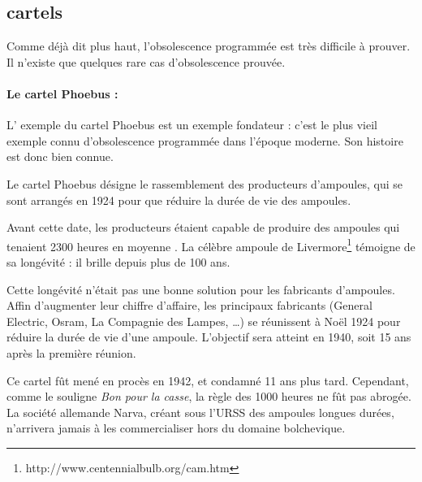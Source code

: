 \subsection{cartels}



Comme déjà dit plus haut, l'obsolescence programmée est très difficile à prouver. Il n'existe que quelques rare cas d'obsolescence prouvée. 

\paragraph*{Le cartel Phoebus : } L' exemple du cartel Phoebus est un exemple fondateur : c'est le plus vieil exemple connu d'obsolescence programmée dans l'époque moderne. Son histoire est donc bien connue. 

Le cartel Phoebus désigne le rassemblement des producteurs d'ampoules, qui se sont arrangés en 1924 pour que réduire la durée de vie des ampoules. 

Avant cette date, les producteurs étaient capable de produire des ampoules qui tenaient 2300 heures en moyenne \cite{opes_PHOEBUS}. La célèbre ampoule de Livermore\footnote{http://www.centennialbulb.org/cam.htm} témoigne de sa longévité : il brille depuis plus de 100 ans. 

Cette longévité n'était pas une bonne solution pour les fabricants d'ampoules. Affin d'augmenter leur chiffre d'affaire,  les principaux fabricants (General Electric, Osram, La Compagnie des Lampes, \dots) se réunissent à Noël 1924 pour réduire la durée de vie d'une ampoule. L'objectif sera atteint  en 1940, soit 15 ans après la première réunion. 

Ce cartel fût mené en procès en 1942, et condamné 11 ans plus tard. Cependant, comme le souligne \textit{Bon pour la casse}, la règle des 1000 heures ne fût pas abrogée. La société allemande Narva, créant sous l'URSS des ampoules longues durées, n'arrivera jamais à les commercialiser hors du domaine bolchevique. 

